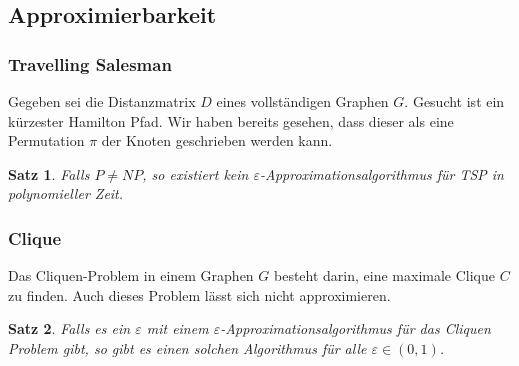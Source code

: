 \documentclass[a4paper, 12pt]{article}
\theoremstyle{plain}
\newtheorem{theorem}{Satz}[section] %
\theoremstyle{definition}
\theoremstyle{lemma}
\theoremstyle{remark}
\theoremstyle{corollary}
\theoremstyle{example}
\begin{document}
\subsection{Approximierbarkeit}
	\subsubsection{Travelling Salesman}
	Gegeben sei die Distanzmatrix $D$ eines vollständigen Graphen $G$. Gesucht ist ein kürzester Hamilton Pfad. Wir haben bereits gesehen, dass dieser als eine Permutation $\pi$ der Knoten geschrieben werden kann.
	\begin{theorem}
		Falls $P\neq NP$, so existiert kein $\varepsilon$-Approximationsalgorithmus für TSP in polynomieller Zeit.
	\end{theorem}
	\subsubsection{Clique}
	Das Cliquen-Problem in einem Graphen $G$ besteht darin, eine maximale Clique $C$ zu finden. Auch dieses Problem lässt sich nicht approximieren.
	\begin{theorem}
		Falls es ein $\varepsilon$ mit einem $\varepsilon$-Approximationsalgorithmus für das Cliquen Problem gibt, so gibt es einen solchen Algorithmus für alle $\varepsilon \in (0,1)$.
	\end{theorem}
\end{document}
